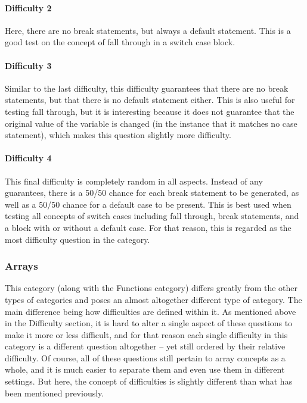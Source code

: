 \documentclass{article}
\begin{document}
\paragraph{Difficulty 2} \hfill \par

Here, there are no break statements, but always a default statement. This is a good test on the concept of fall through in a switch case block.

\paragraph{Difficulty 3} \hfill \par

Similar to the last difficulty, this difficulty guarantees that there are no break statements, but that there is no default statement either. This is also useful for testing fall through, but it is 
interesting because it does not guarantee that the original value of the variable is changed (in the instance that it matches no case statement), which makes this question slightly more 
difficulty.

\paragraph{Difficulty 4} \hfill \par

This final difficulty is completely random in all aspects. Instead of any guarantees, there is a 50/50 chance for each break statement to be generated, as well as a 50/50 chance for a default 
case to be present. This is best used when testing all concepts of switch cases including fall through, break statements, and a block with or without a default case. For that reason, this is 
regarded as the most difficulty question in the category. 

\subsubsection{Arrays}

This category (along with the Functions category) differs greatly from the other types of categories and poses an almost altogether different type of category. The main difference being how difficulties are defined within it. As mentioned above in the Difficulty section, it is hard to alter a single aspect of these questions to make it more or less difficult, and
for that reason each single difficulty in this category is a different question altogether -- yet still ordered by their relative difficulty. Of course, all of these questions still pertain to array concepts
as a whole, and it is much easier to separate them and even use them in different settings. But here, the concept of difficulties is slightly different than what has been mentioned previously. 
\end{document}

